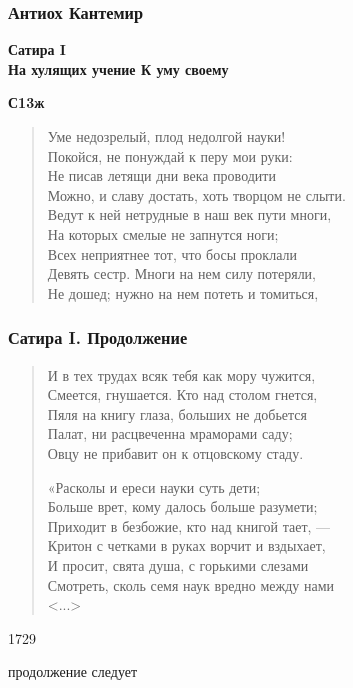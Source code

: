 \documentclass{beamer}
\begin{document}
\begin{frame}
\frametitle{Антиох Кантемир}

\begin{center}
\textbf{Сатира I \\На хулящих учение {\small К уму своему}}
\end{center}

\textbf{С13ж}

\begin{verse}
Уме недозрелый, плод недолгой науки!\\
Покойся, не понуждай к перу мои руки:\\
Не писав летящи дни века проводити\\
Можно, и славу достать, хоть творцом не слыти.\\
Ведут к ней нетрудные в наш век пути многи,\\
На которых смелые не запнутся ноги;\\
Всех неприятнее тот, что босы проклали\\
Девять сестр. Многи на нем силу потеряли,\\
Не дошед; нужно на нем потеть и томиться,\\
\end{verse}

\end{frame}
%
%
\begin{frame}
\frametitle{Сатира I. Продолжение}

\begin{verse}
И в тех трудах всяк тебя как мору чужится,\\
Смеется, гнушается. Кто над столом гнется,\\
Пяля на книгу глаза, больших не добьется\\
Палат, ни расцвеченна мраморами саду;\\
Овцу не прибавит он к отцовскому стаду.

«Расколы и ереси науки суть дети;\\
Больше врет, кому далось больше разумети;\\
Приходит в безбожие, кто над книгой тает, —\\
Критон с четками в руках ворчит и вздыхает,\\
И просит, свята душа, с горькими слезами\\
Смотреть, сколь семя наук вредно между нами\\
<...>
\end{verse}
1729

\end{frame}


\begin{frame}
\Huge{\centerline{продолжение следует}}
\end{frame}
\end{document}
